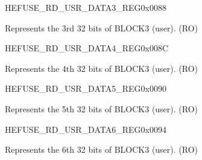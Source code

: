 \begin{register}{H}{EFUSE\_RD\_USR\_DATA3\_REG}{0x0088}\label{regdesc:EFUSERDUSRDATA3REG}
%
\regnewline%
\begin{regdesc}\begin{reglist}
\label{fielddesc:EFUSEUSRDATA3}\item [EFUSE\_USR\_DATA3] Represents the 3rd 32 bits of BLOCK3 (user). (RO)
\end{reglist}\end{regdesc}
\end{register}


\begin{register}{H}{EFUSE\_RD\_USR\_DATA4\_REG}{0x008C}\label{regdesc:EFUSERDUSRDATA4REG}
%
\regnewline%
\begin{regdesc}\begin{reglist}
\label{fielddesc:EFUSEUSRDATA4}\item [EFUSE\_USR\_DATA4] Represents the 4th 32 bits of BLOCK3 (user). (RO)
\end{reglist}\end{regdesc}
\end{register}


\begin{register}{H}{EFUSE\_RD\_USR\_DATA5\_REG}{0x0090}\label{regdesc:EFUSERDUSRDATA5REG}
%
\regnewline%
\begin{regdesc}\begin{reglist}
\label{fielddesc:EFUSEUSRDATA5}\item [EFUSE\_USR\_DATA5] Represents the 5th 32 bits of BLOCK3 (user). (RO)
\end{reglist}\end{regdesc}
\end{register}


\begin{register}{H}{EFUSE\_RD\_USR\_DATA6\_REG}{0x0094}\label{regdesc:EFUSERDUSRDATA6REG}
%
\regnewline%
\begin{regdesc}\begin{reglist}
\label{fielddesc:EFUSEUSRDATA6}\item [EFUSE\_USR\_DATA6] Represents the 6th 32 bits of BLOCK3 (user). (RO)
\end{reglist}\end{regdesc}
\end{register}


